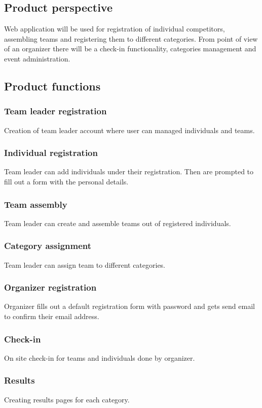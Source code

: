 \documentclass[a4paper]{article}
\begin{document}
	\subsection{Product perspective}
	\label{sub:perspective}
	Web application will be used for registration of individual competitors, assembling teams and registering them to different categories. From point of view of an organizer there will be a check-in functionality, categories management and event administration.
	\subsection{Product functions}
	\label{sub:functions}
	\subsubsection{Team leader registration}
	Creation of team leader account where user can managed individuals and teams. 
	\subsubsection{Individual registration}
	Team leader can add individuals under their registration. Then are prompted to fill out a form with the personal details.
	\subsubsection{Team assembly}
	Team leader can create and assemble teams out of registered individuals.
	\subsubsection{Category assignment}
	Team leader can assign team to different categories.
	\subsubsection{Organizer registration}
	Organizer fills out a default registration form with password and gets send email to confirm their email address.
	\subsubsection{Check-in}
	On site check-in for teams and individuals done by organizer.
	\subsubsection{Results}
	Creating results pages for each category.
\end{document}
